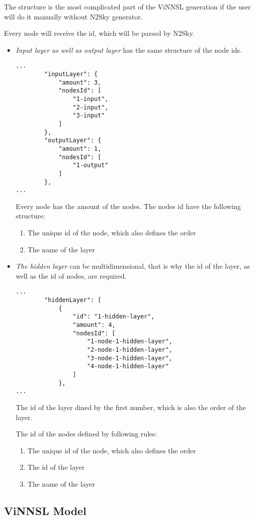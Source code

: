 The structure is the most complicated part of the ViNNSL generation if the user will do it manually without N2Sky generator. 

Every node will receive the id, which will be parsed by N2Sky.

\begin{itemize}
\item \emph{Input layer as well as output layer} has the same structure of the node ids.
 \begin{lstlisting}[caption=ViNNSL generated layers]
...
		"inputLayer": {
			"amount": 3,
			"nodesId": [
				"1-input",
				"2-input",
				"3-input"
			]
		},
		"outputLayer": {
			"amount": 1,
			"nodesId": [
				"1-output"
			]
		},
...
\end{lstlisting}

Every node has the amount of the nodes. The nodes id have the following structure: 
\begin{enumerate}
\item The unique id of the node, which also defines the order
\item The name of the layer
\end{enumerate}
\item \emph{The hidden layer} can be multidimensional, that is why the id of the layer, as well as the id of nodes, are required.


 \begin{lstlisting}[caption=ViNNSL generated hidden layers]
...
		"hiddenLayer": [
			{
				"id": "1-hidden-layer",
				"amount": 4,
				"nodesId": [
					"1-node-1-hidden-layer",
					"2-node-1-hidden-layer",
					"3-node-1-hidden-layer",
					"4-node-1-hidden-layer"
				]
			},
...
\end{lstlisting}

The id of the layer dined by the first number, which is also the order of the layer.

The id of the nodes defined by following rules:
\begin{enumerate}
\item The unique id of the node, which also defines the order
\item The id of the layer
\item The name of the layer
\end{enumerate}

\end{itemize}


\subsection{ViNNSL Model}\label{ViNNSL Model}

